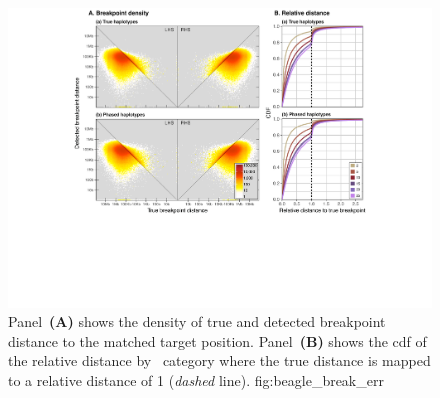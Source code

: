 

\begin{figure}[!htb]
\includegraphics[width=\textwidth]{./img/ch4/break_beagle_err_new}
{Panel~\textbf{(A)} shows the density of true and detected breakpoint distance to the matched target position.
Panel~\textbf{(B)} shows the \gls{cdf} of the relative distance by \fk{}~category where the true distance is mapped to a relative distance of 1 (\emph{dashed} line).}
{fig:beagle_break_err}
\end{figure}
